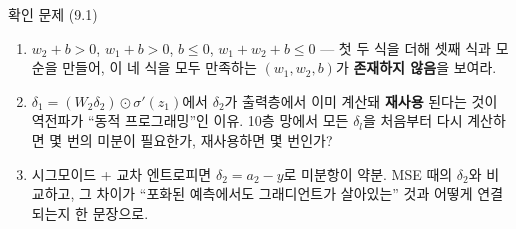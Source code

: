 \begin{frame}{확인 문제 (9.1)}
  \small
  \begin{enumerate}
    \item {} $w_2+b>0$, $w_1+b>0$, $b\le 0$,
      $w_1+w_2+b\le 0$ — 첫 두 식을 더해 셋째 식과 모순을 만들어,
      이 네 식을 모두 만족하는 $(w_1,w_2,b)$가 \textbf{존재하지
      않음}을 보여라.
    \item {} $\delta_1 = (W_2\delta_2)\odot
      \sigma'(z_1)$에서 $\delta_2$가 출력층에서 이미 계산돼 \textbf{재사용}
      된다는 것이 역전파가 ``동적 프로그래밍''인 이유. 10층 망에서
      모든 $\delta_l$을 처음부터 다시 계산하면 몇 번의 미분이 필요한가,
      재사용하면 몇 번인가?
    \item {} 시그모이드 + 교차 엔트로피면
      $\delta_2 = a_2 - y$로 미분항이 약분. MSE 때의 $\delta_2$와
      비교하고, 그 차이가 ``포화된 예측에서도 그래디언트가 살아있는''
      것과 어떻게 연결되는지 한 문장으로.
  \end{enumerate}
\end{frame}
